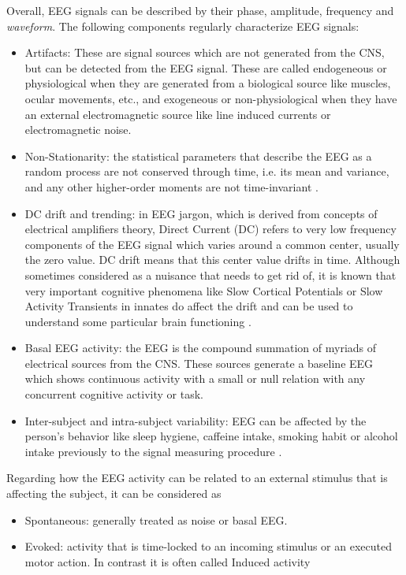 \documentclass[sensors,article,submit,moreauthors,pdftex,10pt,a4paper]{mdpi}
\begin{document}
Overall, EEG signals can be described by their phase, amplitude,  frequency and \textit{waveform}.  The following components regularly  characterize EEG signals:

\begin{itemize}
\item Artifacts:  These are signal sources which are not generated from the CNS, but can be detected from the EEG signal.  These are called endogeneous or physiological when they are generated from a biological source like muscles, ocular movements, etc., and exogeneous or non-physiological when they have an external electromagnetic source like line induced currents or electromagnetic noise\citep{Weeda2012}.
\item Non-Stationarity: the statistical parameters that describe the EEG as a random process are not conserved through time, i.e. its mean and variance, and any other higher-order moments are not time-invariant \citep{Jansen1991}.
\item DC drift and trending: in EEG jargon, which is derived from concepts of electrical amplifiers theory, Direct Current (DC) refers to very low frequency components of the EEG signal which varies around a common center, usually the zero value.  DC drift means that this center value drifts in time.  Although sometimes considered as a nuisance that needs to get rid of, it is known that very important cognitive phenomena like Slow Cortical Potentials or Slow Activity Transients in innates do affect the drift and can be used to understand some particular brain functioning \cite{Schomer2010}.
\item Basal EEG activity: the EEG is the compound summation of myriads of electrical sources from the CNS.  These sources generate a baseline EEG which shows continuous activity with a small or null relation with any concurrent cognitive activity or task.
\item Inter-subject and intra-subject variability: EEG can be affected by the person's behavior like sleep hygiene, caffeine intake, smoking habit or alcohol intake previously to the signal measuring procedure \citep{Farzan2017}.
\end{itemize}

Regarding how the EEG activity can be related to an external stimulus that is affecting the subject, it can be considered as

\begin{itemize}
\item Spontaneous: generally treated as noise or basal EEG.
\item Evoked: activity that is time-locked to an incoming stimulus or an executed motor action.  In contrast it is often called Induced activity
\end{itemize}
\end{document}
